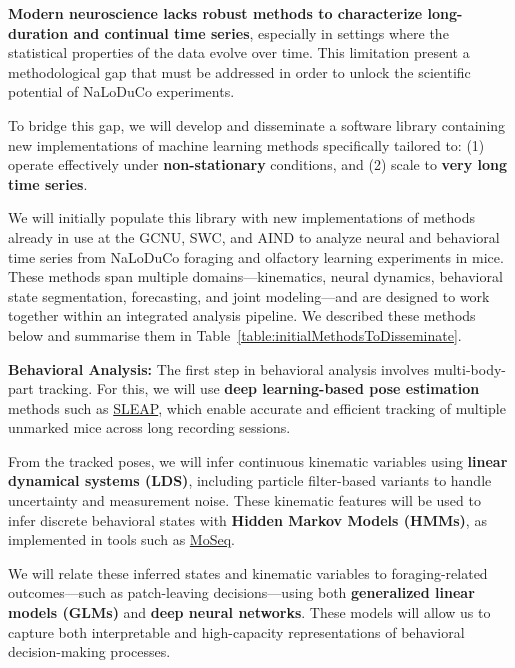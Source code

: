

\textbf{Modern neuroscience lacks robust methods to characterize long-duration
and continual time series}, especially in settings where the statistical
properties of the data evolve over time. This limitation present a
methodological gap that must be addressed in order to unlock the scientific
potential of NaLoDuCo experiments.

To bridge this gap, we will develop and disseminate a software library
containing new implementations of machine learning methods specifically
tailored to: (1) operate effectively under \textbf{non-stationary} conditions,
and (2) scale to \textbf{very long time series}.

\label{sec:initialListOfMethods}

We will initially populate this library with new implementations of methods
already in use at the GCNU, SWC, and AIND to analyze neural and behavioral time
series from NaLoDuCo foraging and olfactory learning experiments in mice. These
methods span multiple domains—kinematics, neural dynamics, behavioral state
segmentation, forecasting, and joint modeling—and are designed to work together
within an integrated analysis pipeline. We described these methods below and
summarise them in Table~\ref{table:initialMethodsToDisseminate}.

\vspace{1em}
\noindent\textbf{Behavioral Analysis:}  
The first step in behavioral analysis involves multi-body-part tracking. For
this, we will use \textbf{deep learning-based pose estimation} methods such as
\href{https://github.com/talmolab/sleap}{SLEAP}, which enable accurate and
efficient tracking of multiple unmarked mice across long recording sessions.

From the tracked poses, we will infer continuous kinematic variables using
\textbf{linear dynamical systems (LDS)}, including particle filter-based
variants to handle uncertainty and measurement noise. These kinematic features
will be used to infer discrete behavioral states with \textbf{Hidden Markov
Models (HMMs)}, as implemented in tools such as
\href{https://dattalab.github.io/moseq2-website/index.html}{MoSeq}.

We will relate these inferred states and kinematic variables to
foraging-related outcomes—such as patch-leaving decisions—using both
\textbf{generalized linear models (GLMs)} and \textbf{deep neural networks}.
These models will allow us to capture both interpretable and high-capacity
representations of behavioral decision-making processes.

